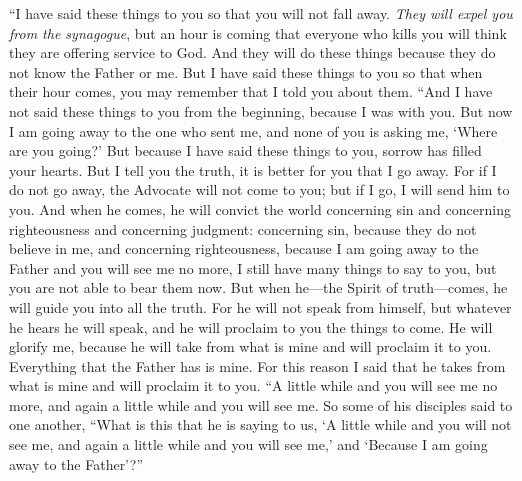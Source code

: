 \begin{biblechapter} %
 “I have said these things to you so that you will not fall away.
\verse \textit{They will expel you from the synagogue}, but an hour is coming that everyone who kills you will think they are offering service to God.
\verse And they will do these things because they do not know the Father or me.
\verse But I have said these things to you so that when their hour comes, you may remember that I told you about them.
 “And I have not said these things to you from the beginning, because I was with you.
\verse But now I am going away to the one who sent me, and none of you is asking me, ‘Where are you going?’
\verse But because I have said these things to you, sorrow has filled your hearts.
\verse But I tell you the truth, it is better for you that I go away. For if I do not go away, the Advocate will not come to you; but if I go, I will send him to you.
\verse And when he comes, he will convict the world concerning sin and concerning righteousness and concerning judgment:
\verse concerning sin, because they do not believe in me,
\verse and concerning righteousness, because I am going away to the Father and you will see me no more,
\verse I still have many things to say to you, but you are not able to bear them now.
\verse But when he—the Spirit of truth—comes, he will guide you into all the truth. For he will not speak from himself, but whatever he hears he will speak, and he will proclaim to you the things to come.
\verse He will glorify me, because he will take from what is mine and will proclaim it to you.
\verse Everything that the Father has is mine. For this reason I said that he takes from what is mine and will proclaim it to you.
 “A little while and you will see me no more, and again a little while and you will see me.
\verse So some of his disciples said to one another, “What is this that he is saying to us, ‘A little while and you will not see me, and again a little while and you will see me,’ and ‘Because I am going away to the Father’?”

\end{biblechapter}

